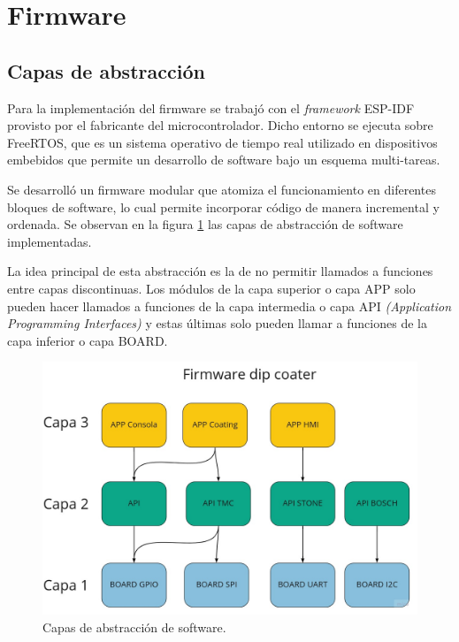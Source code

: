 
\section{Firmware}
\subsection{Capas de abstracción}

Para la implementación del firmware se trabajó con el \textit{framework} ESP-IDF \citep{web_esp_idf} provisto por el fabricante del microcontrolador. Dicho entorno se ejecuta sobre FreeRTOS, que es un sistema operativo de tiempo real utilizado en dispositivos embebidos que permite un desarrollo de software bajo un esquema multi-tareas.

Se desarrolló un firmware modular que atomiza el funcionamiento en diferentes bloques de software, lo cual permite incorporar código de manera incremental y ordenada. Se observan en la figura \ref{fig:capas} las capas de abstracción de software implementadas.

La idea principal de esta abstracción es la de no permitir llamados a funciones entre capas discontinuas. Los módulos de la capa superior o capa APP solo pueden hacer llamados a funciones de la capa intermedia o capa API \textit{(Application Programming Interfaces)} y estas últimas solo pueden llamar a funciones de la capa inferior o capa BOARD.


\begin{figure}[h]
	\centering
	\includegraphics[width=1\textwidth]{./Figures/capas.jpg}
	\caption{Capas de abstracción de software.}
	\label{fig:capas}
\end{figure}


